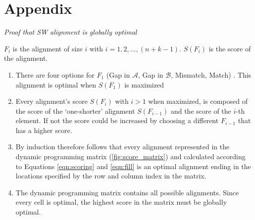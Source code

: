 \documentclass[12pt]{article} %
\begin{document}




\clearpage

\section*{Appendix}

\textit{Proof that SW alignment is globally optimal}

$F_i$ is the alignment of size $i$ with $i = 1,2,...,(n + k - 1)$. $S(F_i)$ is the score of the alignment.

\begin{enumerate}
\item There are four options for $F_1$ (Gap in $\mathcal{A}$, Gap in
    $\mathcal{B}$, Mismatch, Match) . This alignment is optimal when $S(F_1)$ is maximized
\item Every alignment's score $S(F_i)$ with $i > 1$ when maximized, is composed of the score of the `one-shorter' alignment $S(F_{i-1})$ and the score of the $i$-th element. If not the score could be increased by choosing a different $F_{i-1}$ that has a higher score.
\item By induction therefore follows that every alignment represented in the
    dynamic programming matrix (\ref{fig:score_matrix}) and calculated according
        to Equations \ref{eqn:scoring} and \ref{eqn:fill} is an optimal alignment
    ending in the locations specified by the row and column index in the matrix.
\item The dynamic programming matrix contains all possible alignments. Since
    every cell is optimal, the highest score in the matrix must be globally
    optimal.
\end{enumerate}
\end{document}

